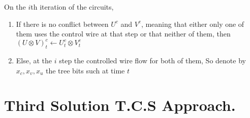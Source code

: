 \documentclass[manuscript,screen,review]{acmart}
\begin{document}
On the $i$th iteration of the circuits,
\begin{enumerate}  
  \item If there is no conflict between $U^{c}$ and $V^{c}$, meaning that either only one of them uses the control wire at that step or that neither of them, then $(U \otimes V)^{c}_{t} \leftarrow U^{c}_{t} \otimes V^{c}_{t}$
  \item Else, at the $i$ step the controlled wire flow for both of them, So denote by $ x_{c},x_{v},x_{u}$ the tree bits such at time $t$   

\end{enumerate}
  
 

\section{Third Solution T.C.S Approach.}  

\printbibliography
\end{document}

